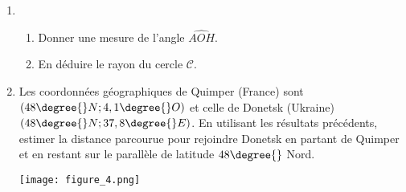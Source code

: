 \documentclass[a4paper]{article}
\begin{document}
\begin{multicols}{2}
  \begin{enumerate}
    \item
      \begin{enumerate}
	\item Donner une mesure de l'angle $\widehat{AOH}$.
	\item En déduire le rayon du cercle $\mathcal{C}$.
      \end{enumerate}
    \item Les coordonnées géographiques de Quimper (France) sont $(48\degree{}N;4,1\degree{}O)$ et celle de Donetsk (Ukraine) $(48\degree{}N;37,8\degree{}E)$. En utilisant les résultats précédents, estimer la distance parcourue pour rejoindre Donetsk en partant de Quimper et en restant sur le parallèle de latitude $48\degree{}$ Nord.

      \vspace*{1cm}
      \begin{center}
	\texttt{[image: figure\_4.png]}
      \end{center}
  \end{enumerate}
\end{multicols}
\end{document}
